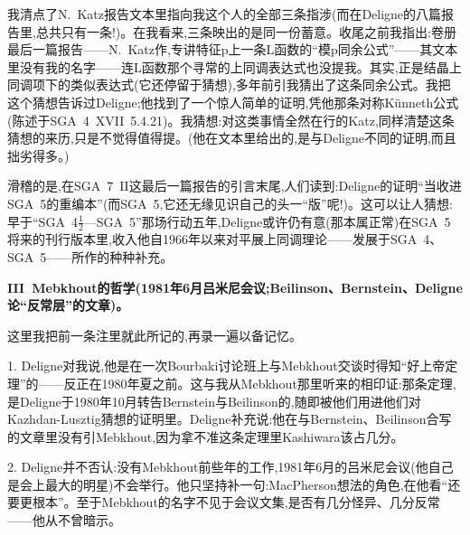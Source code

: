 我清点了N.~Katz报告文本里指向我这个人的全部三条指涉(而在Deligne的八篇报告里,总共只有一条!)。在我看来,三条映出的是同一份蓄意。收尾之前我指出:卷册最后一篇报告——N.~Katz作,专讲特征p上一条L函数的“模p同余公式”——其文本里没有我的名字——连L函数那个寻常的上同调表达式也没提我。其实,正是结晶上同调项下的类似表达式(它还停留于猜想),多年前引我猜出了这条同余公式。我把这个猜想告诉过Deligne;他找到了一个惊人简单的证明,凭他那条对称Künneth公式(陈述于SGA~4~XVII~5.4.21)。我猜想:对这类事情全然在行的Katz,同样清楚这条猜想的来历,只是不觉得值得提。(他在文本里给出的,是与Deligne不同的证明,而且拙劣得多。)

滑稽的是,在SGA~7~II这最后一篇报告的引言末尾,人们读到:Deligne的证明“当收进SGA~5的重编本”(而SGA~5,它还无缘见识自己的头一“版”呢\dmark{}!)。这可以让人猜想:早于“SGA~4$\frac{1}{2}$—SGA~5”那场行动五年,Deligne或许仍有意(那本属正常)在SGA~5将来的刊行版本里,收入他自1966年以来对平展上同调理论——发展于SGA~4、SGA~5——所作的种种补充。

\textbf{III~Mebkhout的哲学(1981年6月吕米尼会议;Beilinson、Bernstein、Deligne论“反常层”的文章)。}

这里我把前一条注里就此所记的,再录一遍以备记忆。

1. Deligne对我说,他是在一次Bourbaki讨论班上与Mebkhout交谈时得知“好上帝定理”的——反正在1980年夏之前。这与我从Mebkhout那里听来的相印证:那条定理,是Deligne于1980年10月转告Bernstein与Beilinson的,随即被他们用进他们对Kazhdan-Lusztig猜想的证明里。Deligne补充说:他在与Bernstein、Beilinson合写的文章里没有引Mebkhout,因为拿不准这条定理里Kashiwara该占几分。

2. Deligne并不否认:没有Mebkhout前些年的工作,1981年6月的吕米尼会议(他自己是会上最大的明星)不会举行。他只坚持补一句:MacPherson想法的角色,在他看“还要更根本”。至于Mebkhout的名字不见于会议文集,是否有几分怪异、几分反常——他从不曾暗示。

